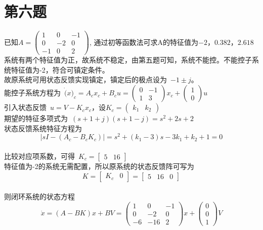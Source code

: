 \documentclass[a4paper]{article}
\begin{document}
\section*{第六题}
已知$A=\left(\begin{array}{ccc} 1 & 0 & -1\\ 0 & -2 & 0\\ -1 & 0 & 2 \end{array}\right)$, 通过初等函数法可求A的特征值为$ -2， 0.382， 2.618$ \\
系统有两个特征值为正，故系统不稳定，由第五题可知，系统不能控。不能控子系统特征值为-2，符合可镇定条件。 \\
\mbox{故原系统可用状态反馈实现镇定，镇定后的极点设为 }$ -1 \pm j $。 \\
\mbox{能控子系统方程为 }$\dot(x)_c=A_cx_c+B_cu= \left(\begin{array}{cc} 0 & -1\\ 1 & 3 \end{array}\right)x_c+\left(\begin{array}{cc} 1 \\ 0 \end{array}\right)u$ \\
\mbox{引入状态反馈 }$u=V-K_cx_c$，设$ K_c=\left(\begin{array}{cc} k_1 & k_2 \end{array}\right) $ \\
\mbox{期望的特征多项式为 }$ (s+1+j)(s+1-j)=s^2+2s+2 $ \\
状态反馈系统特征方程为 \\
$$ \left|sI-(A_c-B_cK_c)\right|=s^2+(k_1-3)s-3k_1+k_2+1=0 $$ \\
\mbox{比较对应项系数，可得 }$K_c=\left[\begin{array}{cc} 5 & 16 \end{array}\right] $ \\
特征值为-2的系统无需配置，所以原系统的状态反馈阵可写为 \\
$$ K=\left[\begin{array}{cc} K_c & 0 \end{array}\right]=\left[\begin{array}{ccc} 5 & 16 & 0 \end{array}\right] $$\\
则闭环系统的状态方程
$$ \dot{x}=(A-BK)x+BV= \left(\begin{array}{ccc} 1 & 0 & -1\\ 0 & -2 & 0\\ -6 & -16 & 2 \end{array}\right)x+\left(\begin{array}{ccc} 0 \\ 0 \\ 1 \end{array}\right)V $$ \\
\end{document}
